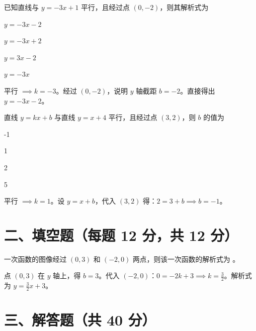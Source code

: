 \documentclass{exam-zh}
\begin{document}
\begin{question}[points=12]
  已知直线与 $y = -3x + 1$ 平行，且经过点 $(0, -2)$，则其解析式为
  \begin{choices}
    \item $y = -3x - 2$
    \item $y = -3x + 2$
    \item $y = 3x - 2$
    \item $y = -3x$
  \end{choices}
  \paren[A]
  \begin{solutionblock}
    平行 $\implies k = -3$。经过 $(0,-2)$，说明 $y$ 轴截距 $b = -2$。直接得出 $y = -3x - 2$。
  \end{solutionblock}
\end{question}



\begin{question}[points=12]
  直线 $y = kx + b$ 与直线 $y = x + 4$ 平行，且经过点 $(3, 2)$，则 $b$ 的值为
  \begin{choices}
    \item -1
    \item 1
    \item 2
    \item 5
  \end{choices}
  \paren[A]
  \begin{solutionblock}
    平行 $\implies k = 1$。设 $y = x + b$，代入 $(3,2)$ 得：$2 = 3 + b \implies b = -1$。
  \end{solutionblock}
\end{question}


\section*{二、填空题（每题 12 分，共 12 分）}


\begin{question}[points=12]
  一次函数的图像经过 $(0, 3)$ 和 $(-2, 0)$ 两点，则该一次函数的解析式为 \fillin。
  \paren[$y = \dfrac{3}{2}x + 3$]
  \begin{solutionblock}
    点 $(0,3)$ 在 $y$ 轴上，得 $b = 3$。代入 $(-2,0)$：$0 = -2k + 3 \implies k = \frac{3}{2}$。解析式为 $y = \frac{3}{2}x + 3$。
  \end{solutionblock}
\end{question}


\section*{三、解答题（共 40 分）}
\end{document}
